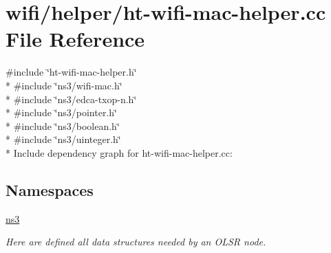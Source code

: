 \hypertarget{ht-wifi-mac-helper_8cc}{}\section{wifi/helper/ht-\/wifi-\/mac-\/helper.cc File Reference}
\label{ht-wifi-mac-helper_8cc}
{\ttfamily \#include \char`\"{}ht-\/wifi-\/mac-\/helper.\+h\char`\"{}}\\*
{\ttfamily \#include \char`\"{}ns3/wifi-\/mac.\+h\char`\"{}}\\*
{\ttfamily \#include \char`\"{}ns3/edca-\/txop-\/n.\+h\char`\"{}}\\*
{\ttfamily \#include \char`\"{}ns3/pointer.\+h\char`\"{}}\\*
{\ttfamily \#include \char`\"{}ns3/boolean.\+h\char`\"{}}\\*
{\ttfamily \#include \char`\"{}ns3/uinteger.\+h\char`\"{}}\\*
Include dependency graph for ht-\/wifi-\/mac-\/helper.cc\+:
\subsection*{Namespaces}
\begin{DoxyCompactItemize}
\item 
 \hyperlink{namespacens3}{ns3}
\begin{DoxyCompactList}\small\item\em Here are defined all data structures needed by an O\+L\+SR node. \end{DoxyCompactList}\end{DoxyCompactItemize}

